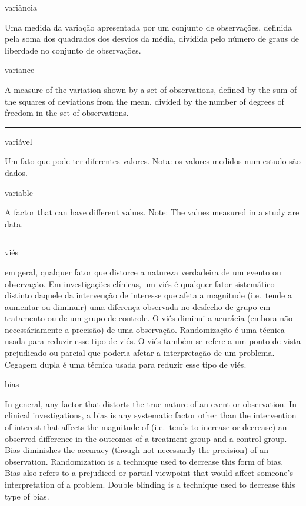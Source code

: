 \documentclass[
]{book}
\begin{document}
variância

Uma medida da variação apresentada por um conjunto de observações, definida pela soma dos quadrados dos desvios da média, dividida pelo número de graus de liberdade no conjunto de observações.

variance

A measure of the variation shown by a set of observations, defined by the sum of the squares of deviations from the mean, divided by the number of degrees of freedom in the set of observations.

\begin{center}\rule{0.5\linewidth}{0.5pt}\end{center}

variável

Um fato que pode ter diferentes valores. Nota: os valores medidos num estudo são dados.

variable

A factor that can have different values. Note: The values measured in a study are data.

\begin{center}\rule{0.5\linewidth}{0.5pt}\end{center}

viés

em geral, qualquer fator que distorce a natureza verdadeira de um evento ou observação. Em investigações clínicas, um viés é qualquer fator sistemático distinto daquele da intervenção de interesse que afeta a magnitude (i.e.~tende a aumentar ou diminuir) uma diferença observada no desfecho de grupo em tratamento ou de um grupo de controle. O viés diminui a acurácia (embora não necessáriamente a precisão) de uma observação. Randomização é uma técnica usada para reduzir esse tipo de viés. O viés também se refere a um ponto de vista prejudicado ou parcial que poderia afetar a interpretação de um problema. Cegagem dupla é uma técnica usada para reduzir esse tipo de viés.

bias

In general, any factor that distorts the true nature of an event or observation. In clinical investigations, a bias is any systematic factor other than the intervention of interest that affects the magnitude of (i.e.~tends to increase or decrease) an observed difference in the outcomes of a treatment group and a control group. Bias diminishes the accuracy (though not necessarily the precision) of an observation. Randomization is a technique used to decrease this form of bias. Bias also refers to a prejudiced or partial viewpoint that would affect someone's interpretation of a problem. Double blinding is a technique used to decrease this type of bias.
\end{document}
